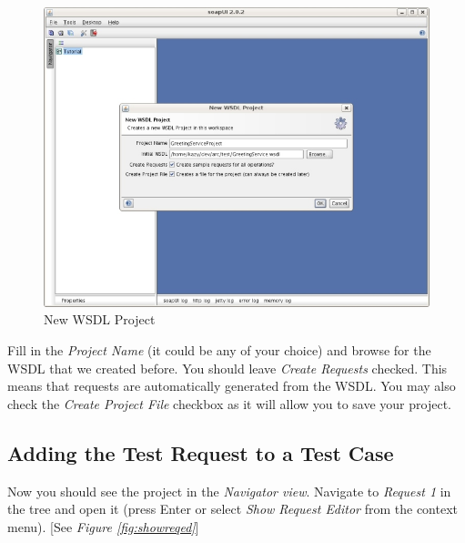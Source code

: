 \documentclass{article}
\begin{document}
\begin{figure}[!hbp]
\begin{center}
\includegraphics{fig/ARC1PythonDGDraft-img2_resize.jpg}
\caption{New WSDL Project}
\label{fig:newwsdl}
\end{center}
\end{figure}

Fill in the \textit{Project Name} (it could be any of your choice) and
browse for the WSDL that we created before. You should leave
\textit{Create Requests} checked. This means that requests are
automatically generated from the WSDL. You may also check the
\textit{Create Project File} checkbox as it will allow you to save
your project.

\subsection{Adding the Test Request to a Test Case}
\label{sec:addtr2tc}

Now you should see the project in the \textit{Navigator
  view}. Navigate to \textit{Request 1} in the tree and open it (press
Enter or select \textit{Show Request Editor} from the context
menu). [See \emph{Figure \ref{fig:showreqed}}]
\end{document}
